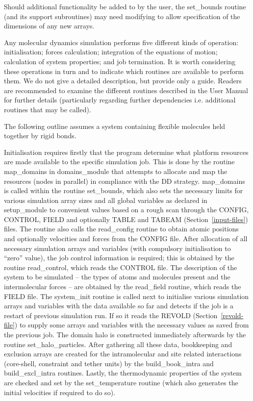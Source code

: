 Should additional functionality be added to \D by the user, the
{\sc set\_bounds} routine (and its support subroutines) may need
modifying to allow specification of the dimensions of any new
arrays.

Any molecular dynamics simulation performs five different kinds of
operation: initialisation; forces calculation; integration of the
equations of motion; calculation of system properties; and job
termination.  It is worth considering these operations in turn and
to indicate which \D routines are available to perform them.  We do
not give a detailed description, but provide only a guide.  Readers
are recommended to examine the different routines described in the
\D User Manual for further details (particularly regarding further
dependencies i.e. additional routines that may be called).

The following outline assumes a system containing flexible molecules
held together by rigid bonds.

Initialisation requires firstly that the program determine what
platform resources are made available to the specific simulation
job.  This is done by the \D routine {\sc map\_domains} in
{\sc domains\_module} that attempts to allocate and map the
resources (nodes in parallel) in compliance with the DD
strategy.  {\sc map\_domains} is called
within the routine {\sc set\_bounds}, which also sets the necessary
limits for various simulation array sizes and all global
variables as declared in {\sc setup\_module} to convenient values
based on a rough scan through the CONFIG, CONTROL, FIELD and optionally
TABLE and TABEAM (Section~\ref{input-files}) files.  The routine also
calls the {\sc read\_config} routine to obtain atomic positions and
optionally velocities and forces from the CONFIG file.  After allocation
of all necessary simulation arrays and variables (with compulsory
initialisation to ``zero'' value), the job control information is
required; this is obtained by the routine {\sc read\_control}, which
reads the CONTROL file.  The description of the system to be
simulated -- the types of atoms and molecules present and the
intermolecular forces -- are obtained by the {\sc read\_field} routine,
which reads the FIELD file.  The {\sc system\_init} routine is
called next to initialise various simulation arrays and variables
with the data available so far and detects if the job is a restart of
previous simulation run.  If so it reads the REVOLD (Section~\ref{revold-file})
to supply some arrays and variables with the necessary values as
saved from the previous job.  The domain halo is constructed
immediately afterwards by the routine {\sc set\_halo\_particles}.
After gathering all these data, bookkeeping and exclusion arrays are
created for the intramolecular and site related interactions
(core-shell, constraint and tether units) by the {\sc build\_book\_intra}
and {\sc build\_excl\_intra} routines.  Lastly, the thermodynamic
properties of the system are checked and set by the {\sc set\_temperature}
routine (which also generates the initial velocities if required to do so).

